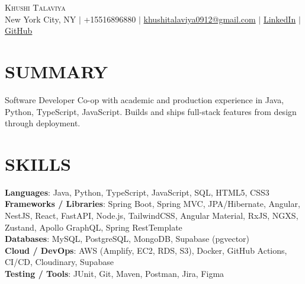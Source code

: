 \documentclass[letterpaper,11pt]{article}
\begin{document}
\begin{center}
    {\Huge \scshape Khushi Talaviya} \\ \vspace{2pt}
    \vspace{4pt}
    \small
    New York City, NY $|$
    \small
    +15516896880 $|$
    \href{mailto:khushitalaviya0912@gmail.com}{khushitalaviya0912@gmail.com} $|$
    \href{https://www.linkedin.com/in/khushitalaviya/}{LinkedIn} $|$
    \href{https://github.com/talaviyakhushi}{GitHub}
\end{center}

\section{SUMMARY}
\vspace{5pt}
\small{Software Developer Co-op with academic and production experience in Java, Python, TypeScript, JavaScript. Builds and ships full-stack features from design through deployment.}

\vspace{2pt}
\section{SKILLS}
\vspace{5pt}
\begin{itemize}[leftmargin=0in, label={}]
\small{\item{
\textbf{Languages}{: Java, Python, TypeScript, JavaScript, SQL, HTML5, CSS3} \\
\textbf{Frameworks / Libraries}{: Spring Boot, Spring MVC, JPA/Hibernate, Angular, NestJS, React, FastAPI, Node.js, TailwindCSS, Angular Material, RxJS, NGXS, Zustand, Apollo GraphQL, Spring RestTemplate} \\
\textbf{Databases}{: MySQL, PostgreSQL, MongoDB, Supabase (pgvector)} \\
\textbf{Cloud / DevOps}{: AWS (Amplify, EC2, RDS, S3), Docker, GitHub Actions, CI/CD, Cloudinary, Supabase} \\
\textbf{Testing / Tools}{: JUnit, Git, Maven, Postman, Jira, Figma}
}}
\end{itemize}
\vspace{-10pt}

\end{document}
